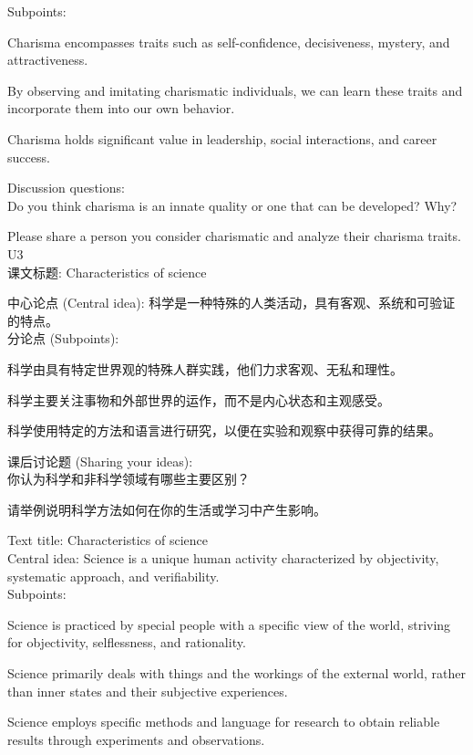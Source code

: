 \documentclass[a4paper,UTF8]{article}
\begin{document}
Subpoints:

Charisma encompasses traits such as self-confidence, decisiveness, mystery, and attractiveness.

By observing and imitating charismatic individuals, we can learn these traits and incorporate them into our own behavior.

Charisma holds significant value in leadership, social interactions, and career success.

Discussion questions:\\

Do you think charisma is an innate quality or one that can be developed? Why?

Please share a person you consider charismatic and analyze their charisma traits.\\

U3\\

课文标题: Characteristics of science

中心论点 (Central idea): 科学是一种特殊的人类活动，具有客观、系统和可验证的特点。\\

分论点 (Subpoints):

科学由具有特定世界观的特殊人群实践，他们力求客观、无私和理性。

科学主要关注事物和外部世界的运作，而不是内心状态和主观感受。

科学使用特定的方法和语言进行研究，以便在实验和观察中获得可靠的结果。

课后讨论题 (Sharing your ideas):\\

你认为科学和非科学领域有哪些主要区别？

请举例说明科学方法如何在你的生活或学习中产生影响。

Text title: Characteristics of science\\

Central idea: Science is a unique human activity characterized by objectivity, systematic approach, and verifiability.\\

Subpoints:

Science is practiced by special people with a specific view of the world, striving for objectivity, selflessness, and rationality.

Science primarily deals with things and the workings of the external world, rather than inner states and their subjective experiences.

Science employs specific methods and language for research to obtain reliable results through experiments and observations.
\end{document}
